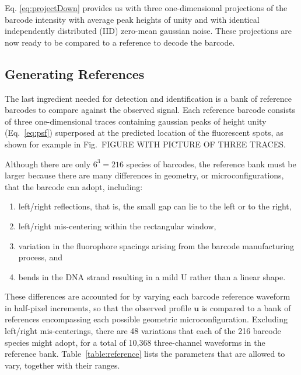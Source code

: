Eq. \ref{eq:projectDown} provides us with three one-dimensional projections of the barcode intensity with average peak heights of unity and with identical independently distributed (IID) zero-mean gaussian noise. These projections are now ready to be compared to a reference to decode the barcode.

\subsection{Generating References}\label{sec:generateReferences}
The last ingredient needed for detection and identification is a bank of reference barcodes to compare against the observed signal. Each reference barcode consists of three one-dimensional traces containing  gaussian peaks of height unity (Eq.~\ref{eq:psf}) superposed at the predicted location of the fluorescent spots, as shown for example in Fig.~FIGURE WITH PICTURE OF THREE TRACES. 


Although there are only $6^3=216$ species of barcodes, the reference bank must be larger because there are many differences in geometry, or microconfigurations, that the barcode can adopt, including:
\begin{enumerate}
\item left/right reflections, that is, the small gap can lie to the left or to the right,
\item left/right mis-centering within the rectangular window,
\item variation in the fluorophore spacings arising from the barcode manufacturing process, and
\item bends in the DNA strand resulting in a mild U rather than a linear shape.
\end{enumerate}
These differences are accounted for by varying each barcode reference waveform in half-pixel increments, so that the observed profile $\mathbf{u}$ is compared to a bank of references encompassing each possible geometric microconfiguration. Excluding left/right mis-centerings, there are 48 variations that each of the 216 barcode species might adopt, for a total of 10,368 three-channel waveforms in the reference bank. Table~\ref{table:reference} lists the parameters that are allowed to vary, together with their ranges. 

